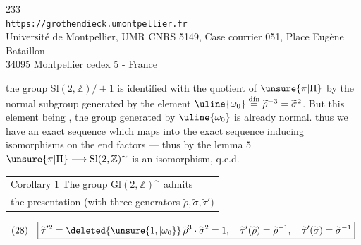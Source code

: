 
\begin{center}
233\\
\texttt{https://grothendieck.umontpellier.fr}\\
Université de Montpellier, UMR CNRS 5149, Case courrier 051, Place Eugène Bataillon\\
34095 Montpellier cedex 5 - France
\end{center}


the group $\mathrm{Sl}(2,\mathbb Z)/\pm1$ is identified with the quotient of $\unsure{\pi|\Pi}$ by the normal subgroup generated by the element $\uline{\omega_0}\overset{\mathrm{dfn}}{=}\widetilde\rho^{-3}=\widetilde\sigma^2$.
But this element being , the group generated by $\uline{\omega_0}$ is already normal.
thus we have an exact sequence
which maps into the exact sequence
inducing  isomorphisms on the end factors --- thus by the lemma  $5$
$\unsure{\pi|\Pi}\longrightarrow\mathrm{Sl}(2,\mathbb Z)^{\sim}$ is an isomorphism, q.e.d.

\begin{tabular}{|l}
\uline{Corollary 1} The group $\mathrm{Gl}(2,\mathbb Z)^{\sim}$ admits\\
the presentation (with three generators $\widetilde\rho,\widetilde\sigma,\widetilde\tau'$)
\end{tabular}
\[
\begin{array}{ll}
(28)&\boxed{
\widetilde\tau'{}^{2}=\deleted{\unsure{1,|\omega_0}}\,
\widetilde\rho^3\cdot\widetilde\sigma^2=1,\quad
\widetilde\tau'(\widetilde\rho)=\widetilde\rho^{-1},\quad
\widetilde\tau'(\widetilde\sigma)=\widetilde\sigma^{-1}}
\end{array}
\]

